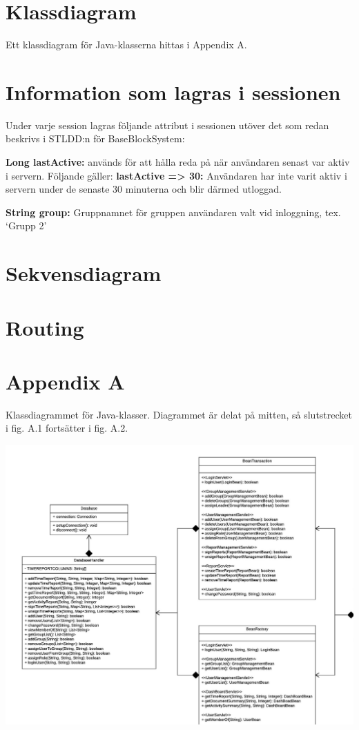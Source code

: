 \documentclass[paper=a4, fontsize=11pt,twoside]{article}
\begin{document}
\section{Klassdiagram}
Ett klassdiagram för Java-klasserna hittas i Appendix A.

\section{Information som lagras i sessionen}

Under varje session lagras följande attribut i sessionen utöver det som redan beskrivs i STLDD:n för BaseBlockSystem:

\textbf{Long lastActive:} 	används för att hålla reda på när användaren senast var aktiv i servern.
\newline
\newline
Följande gäller:
\newline
\textbf{lastActive => 30:}	Användaren har inte varit aktiv i servern under de senaste 30 minuterna och blir därmed utloggad.
	

\textbf{String group:} Gruppnamnet för gruppen användaren valt vid inloggning, tex. ‘Grupp 2’



\section{Sekvensdiagram}
\section{Routing}%

\section{Appendix A}
Klassdiagrammet för Java-klasser. Diagrammet är delat på mitten, så slutstrecket i fig. A.1 fortsätter i fig. A.2.

\includegraphics{Klassdiagram1}
\end{document}
